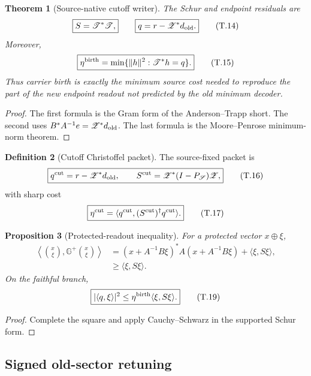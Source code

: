 \documentclass[11pt]{article}
\newtheorem{theorem}{Theorem}[section]
\newtheorem{proposition}[theorem]{Proposition}
\theoremstyle{definition}
\newtheorem{definition}[theorem]{Definition}
\theoremstyle{remark}
\begin{document}
\begin{theorem}[Source-native cutoff writer]
\label{thm:birth-source-birth}
The Schur and endpoint residuals are
\[
 \boxed{S=\mathscr T^*\mathscr T,}
 \qquad
 \boxed{q=r-\mathscr Z^*d_{\rm old}.}
 \tag{T.14}
\]
Moreover,
\[
 \boxed{
 \eta^{\rm birth}
 =\min\{\|h\|^2:\mathscr T^*h=q\}.}
 \tag{T.15}
\]
Thus carrier birth is exactly the minimum source cost needed to reproduce the
part of the new endpoint readout not predicted by the old minimum decoder.
\end{theorem}

\begin{proof}
The first formula is the Gram form of the Anderson--Trapp short.  The second
uses \(B^*A^{-1}e=\mathscr Z^*d_{\rm old}\).  The last formula is the
Moore--Penrose minimum-norm theorem.
\end{proof}

\begin{definition}[Cutoff Christoffel packet]
\label{def:birth-Christoffel}
The source-fixed packet is
\[
 \boxed{
 q^{\rm cut}=r-\mathscr Z^*d_{\rm old},
 \qquad
 S^{\rm cut}=\mathscr Z^*(I-P_{\mathscr S})\mathscr Z,}
 \tag{T.16}
\]
with sharp cost
\[
 \boxed{
 \eta^{\rm cut}
 =\langle q^{\rm cut},(S^{\rm cut})^\dagger q^{\rm cut}\rangle.}
 \tag{T.17}
\]
\end{definition}

\begin{proposition}[Protected-readout inequality]
\label{prop:birth-protected-readout}
For a protected vector \(x\oplus\xi\),
\[
 \boxed{
 \begin{aligned}
 \left\langle\binom{x}{\xi},\mathbb G^+\binom{x}{\xi}\right\rangle
 &=(x+A^{-1}B\xi)^*A(x+A^{-1}B\xi)
   +\langle\xi,S\xi\rangle,\\
 &\ge\langle\xi,S\xi\rangle.
 \end{aligned}}
 \tag{T.18}
\]
On the faithful branch,
\[
 \boxed{
 |\langle q,\xi\rangle|^2
 \le\eta^{\rm birth}\langle\xi,S\xi\rangle.}
 \tag{T.19}
\]
\end{proposition}

\begin{proof}
Complete the square and apply Cauchy--Schwarz in the supported Schur form.
\end{proof}

\subsection{Signed old-sector retuning}
\label{subsec:birth-retuning}
\end{document}
